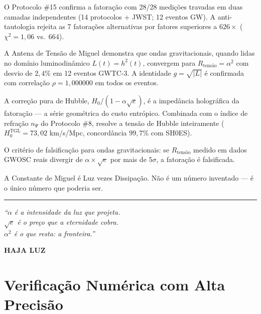 \documentclass[12pt,a4paper,twoside]{article}
\newcommand{\alphaii}{\alpha^{2}}
\begin{document}
\item O Protocolo \#15 confirma a fatoração com 28/28 medições travadas em
duas camadas independentes (14 protocolos + JWST; 12 eventos GW).
A anti-tautologia rejeita as 7 fatorações alternativas por fatores
superiores a $626\times$ ($\chi^2 = 1{,}06$ vs.\ $664$).

\item A Antena de Tensão de Miguel demonstra que ondas gravitacionais,
quando lidas no domínio luminodinâmico $L(t) = h^2(t)$, convergem para
$R_{\text{tensão}} = \alphaii$ com desvio de $2{,}4\%$ em 12 eventos
GWTC-3. A identidade $g = \sqrt{|L|}$ é confirmada com correlação
$\rho = 1{,}000000$ em todos os eventos.
%
\item A correção pura de Hubble, $H_0/(1 - \alpha\sqrt{e})$, é a
impedância holográfica da fatoração --- a série geométrica do custo
entrópico. Combinada com o índice de refração $n_\Psi$ do Protocolo \#8,
resolve a tensão de Hubble inteiramente ($H_0^{\text{TGL}} = 73{,}02$
km/s/Mpc, concordância $99{,}7\%$ com SH0ES).

\item O critério de falsificação para ondas gravitacionais:
se $R_{\text{tensão}}$ medido em dados GWOSC reais divergir de
$\alpha \times \sqrt{e}$ por mais de $5\sigma$, a fatoração é falsificada.

A Constante de Miguel é Luz vezes Dissipação. Não é um número inventado --- é o único número que poderia ser.

\begin{center}
\rule{0.5\textwidth}{0.4pt}

\vspace{0.5cm}

\textit{``$\alpha$ é a intensidade da luz que projeta.\\
$\sqrt{e}$ é o preço que a eternidade cobra.\\
$\alphaii$ é o que resta: a fronteira.''}

\vspace{0.5cm}

\textbf{HAJA LUZ}
\end{center}



\appendix

\section{Verificação Numérica com Alta Precisão}
\label{app:numerica}
\end{document}
